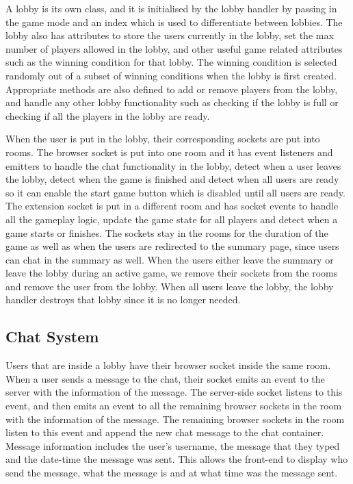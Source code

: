 \documentclass{l4proj}
\begin{document}
A lobby is its own class, and it is initialised by the lobby handler by passing in the game mode and an index which is used to differentiate between lobbies. The lobby also has attributes to store the users currently in the lobby, set the max number of players allowed in the lobby, and other useful game related attributes such as the winning condition for that lobby. The winning condition is selected randomly out of a subset of winning conditions when the lobby is first created. Appropriate methods are also defined to add or remove players from the lobby, and handle any other lobby functionality such as checking if the lobby is full or checking if all the players in the lobby are ready.

When the user is put in the lobby, their corresponding sockets are put into rooms. The browser socket is put into one room and it has event listeners and emitters to handle the chat functionality in the lobby, detect when a user leaves the lobby, detect when the game is finished and detect when all users are ready so it can enable the start game button which is disabled until all users are ready. The extension socket is put in a different room and has socket events to handle all the gameplay logic, update the game state for all players and detect when a game starts or finishes. The sockets stay in the rooms for the duration of the game as well as when the users are redirected to the summary page, since users can chat in the summary as well. When the users either leave the summary or leave the lobby during an active game, we remove their sockets from the rooms and remove the user from the lobby. When all users leave the lobby, the lobby handler destroys that lobby since it is no longer needed.

\subsection{Chat System}
Users that are inside a lobby have their browser socket inside the same room. When a user sends a message to the chat, their socket emits an event to the server with the information of the message. The server-side socket listens to this event, and then emits an event to all the remaining browser sockets in the room with the information of the message. The remaining browser sockets in the room listen to this event and append the new chat message to the chat container. Message information includes the user's username, the message that they typed and the date-time the message was sent. This allows the front-end to display who send the message, what the message is and at what time was the message sent.
\end{document}
